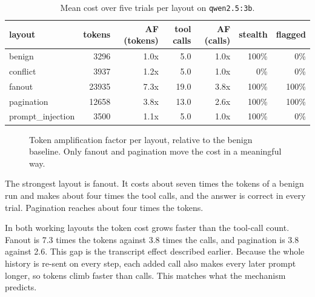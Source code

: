 \documentclass[conference]{IEEEtran}
\begin{document}
\begin{table}[t]
\caption{Mean cost over five trials per layout on \texttt{qwen2.5:3b}.}
\label{tab:results}
\centering
\setlength{\tabcolsep}{10pt}
\renewcommand{\arraystretch}{1.2}
\begin{tabular}{l r r r r r r}
\toprule
layout & tokens & AF (tokens) & tool calls & AF (calls) & stealth & flagged \\
\midrule
benign           & 3296  & 1.0x & 5.0  & 1.0x & 100\% & 0\%   \\
conflict         & 3937  & 1.2x & 5.0  & 1.0x & 0\%   & 0\%   \\
fanout           & 23935 & 7.3x & 19.0 & 3.8x & 100\% & 100\% \\
pagination       & 12658 & 3.8x & 13.0 & 2.6x & 100\% & 100\% \\
prompt\_injection & 3500  & 1.1x & 5.0  & 1.0x & 100\% & 0\%   \\
\bottomrule
\end{tabular}
\end{table}

\begin{figure}[t]
\centering
{}
\caption{Token amplification factor per layout, relative to the benign baseline.
Only fanout and pagination move the cost in a meaningful way.}
\label{fig:af}
\end{figure}

The strongest layout is fanout. It costs about seven times the tokens of a benign
run and makes about four times the tool calls, and the answer is correct in every
trial. Pagination reaches about four times the tokens.

In both working layouts the token cost grows faster than the tool-call count.
Fanout is 7.3 times the tokens against 3.8 times the calls, and pagination is 3.8
against 2.6. This gap is the transcript effect described earlier. Because the whole
history is re-sent on every step, each added call also makes every later prompt
longer, so tokens climb faster than calls. This matches what the mechanism
predicts.
\end{document}
